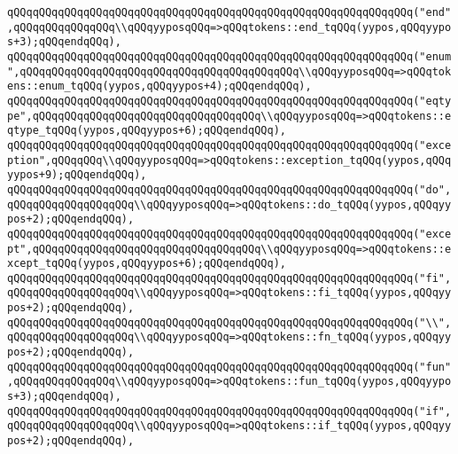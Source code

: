 \verb|qQQqqQQqqQQqqQQqqQQqqQQqqQQqqQQqqQQqqQQqqQQqqQQqqQQqqQQqqQQqqQQq("end",qQQqqQQqqQQqqQQq\\qQQqyyposqQQq=>qQQqtokens::end_tqQQq(yypos,qQQqyypos+3);qQQqendqQQq),|\newline
\verb|qQQqqQQqqQQqqQQqqQQqqQQqqQQqqQQqqQQqqQQqqQQqqQQqqQQqqQQqqQQqqQQq("enum",qQQqqQQqqQQqqQQqqQQqqQQqqQQqqQQqqQQqqQQqqQQq\\qQQqyyposqQQq=>qQQqtokens::enum_tqQQq(yypos,qQQqyypos+4);qQQqendqQQq),|\newline
\verb|qQQqqQQqqQQqqQQqqQQqqQQqqQQqqQQqqQQqqQQqqQQqqQQqqQQqqQQqqQQqqQQq("eqtype",qQQqqQQqqQQqqQQqqQQqqQQqqQQqqQQqqQQq\\qQQqyyposqQQq=>qQQqtokens::eqtype_tqQQq(yypos,qQQqyypos+6);qQQqendqQQq),|\newline
\verb|qQQqqQQqqQQqqQQqqQQqqQQqqQQqqQQqqQQqqQQqqQQqqQQqqQQqqQQqqQQqqQQq("exception",qQQqqQQq\\qQQqyyposqQQq=>qQQqtokens::exception_tqQQq(yypos,qQQqyypos+9);qQQqendqQQq),|\newline
\verb|qQQqqQQqqQQqqQQqqQQqqQQqqQQqqQQqqQQqqQQqqQQqqQQqqQQqqQQqqQQqqQQq("do",qQQqqQQqqQQqqQQqqQQq\\qQQqyyposqQQq=>qQQqtokens::do_tqQQq(yypos,qQQqyypos+2);qQQqendqQQq),|\newline
\verb|qQQqqQQqqQQqqQQqqQQqqQQqqQQqqQQqqQQqqQQqqQQqqQQqqQQqqQQqqQQqqQQq("except",qQQqqQQqqQQqqQQqqQQqqQQqqQQqqQQqqQQq\\qQQqyyposqQQq=>qQQqtokens::except_tqQQq(yypos,qQQqyypos+6);qQQqendqQQq),|\newline
\verb|qQQqqQQqqQQqqQQqqQQqqQQqqQQqqQQqqQQqqQQqqQQqqQQqqQQqqQQqqQQqqQQq("fi",qQQqqQQqqQQqqQQqqQQq\\qQQqyyposqQQq=>qQQqtokens::fi_tqQQq(yypos,qQQqyypos+2);qQQqendqQQq),|\newline
\verb|qQQqqQQqqQQqqQQqqQQqqQQqqQQqqQQqqQQqqQQqqQQqqQQqqQQqqQQqqQQqqQQq("\\",qQQqqQQqqQQqqQQqqQQq\\qQQqyyposqQQq=>qQQqtokens::fn_tqQQq(yypos,qQQqyypos+2);qQQqendqQQq),|\newline
\verb|qQQqqQQqqQQqqQQqqQQqqQQqqQQqqQQqqQQqqQQqqQQqqQQqqQQqqQQqqQQqqQQq("fun",qQQqqQQqqQQqqQQq\\qQQqyyposqQQq=>qQQqtokens::fun_tqQQq(yypos,qQQqyypos+3);qQQqendqQQq),|\newline
\verb|qQQqqQQqqQQqqQQqqQQqqQQqqQQqqQQqqQQqqQQqqQQqqQQqqQQqqQQqqQQqqQQq("if",qQQqqQQqqQQqqQQqqQQq\\qQQqyyposqQQq=>qQQqtokens::if_tqQQq(yypos,qQQqyypos+2);qQQqendqQQq),|\newline
